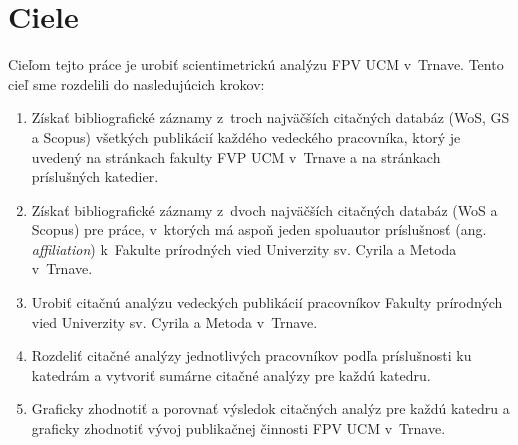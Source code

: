 \chapter{Ciele}

Cieľom tejto práce je urobiť scientimetrickú analýzu FPV UCM v~Trnave.  Tento
cieľ sme rozdelili do nasledujúcich krokov:

\begin{enumerate}
\item Získať bibliografické záznamy z~troch najväčších citačných databáz (WoS,
  GS a Scopus) všetkých publikácií každého vedeckého pracovníka, ktorý je
  uvedený na stránkach fakulty FVP UCM v~Trnave a na stránkach príslušných
  katedier.
\item Získať bibliografické záznamy z~dvoch najväčších citačných databáz (WoS a
  Scopus) pre práce, v~ktorých má aspoň jeden spoluautor príslušnosť
  (ang.\,\emph{affiliation}) k~Fakulte prírodných vied Univerzity sv. Cyrila a
  Metoda v~Trnave.
\item Urobiť citačnú analýzu vedeckých publikácií pracovníkov Fakulty prírodných
  vied Univerzity sv. Cyrila a Metoda v~Trnave.
\item Rozdeliť citačné analýzy jednotlivých pracovníkov podľa príslušnosti ku
  katedrám a vytvoriť sumárne citačné analýzy pre každú katedru.
\item Graficky zhodnotiť a porovnať výsledok citačných analýz pre každú katedru
  a graficky zhodnotiť vývoj publikačnej činnosti FPV UCM v~Trnave.
\end{enumerate}


